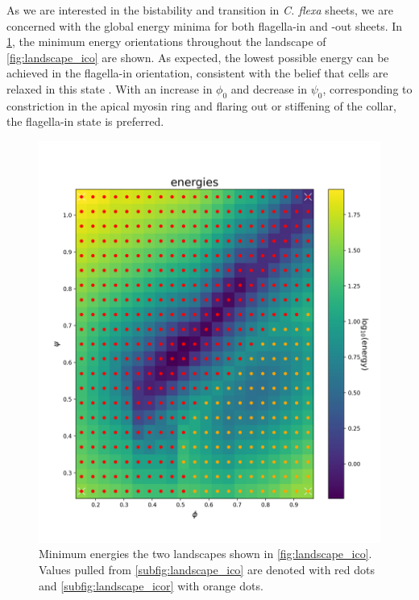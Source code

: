 As we are interested in the bistability and transition in \textit{C. flexa} sheets, we are concerned with the global energy minima for both flagella-in and -out sheets. In \cref{fig:landscape_merge}, the minimum energy orientations throughout the landscape of \cref{fig:landscape_ico} are shown. 
As expected, the lowest possible energy can be achieved in the flagella-in orientation, consistent with the belief that cells are relaxed in this state \citep{brunet2019}.
With an increase in $\phi_0$ and decrease in $\psi_0$, corresponding to constriction in the apical myosin ring and flaring out or stiffening of the collar, the flagella-in state is preferred. 

\begin{figure}[ptbh]
	\centering
	\includegraphics[height=\textheight]{landscape_merge.png}
	\caption[Combined energy landscape]{Minimum energies the two landscapes shown in \cref{fig:landscape_ico}. Values pulled from \cref{subfig:landscape_ico} are denoted with red dots and \cref{subfig:landscape_icor} with orange dots.}
	\label{fig:landscape_merge}
\end{figure}

